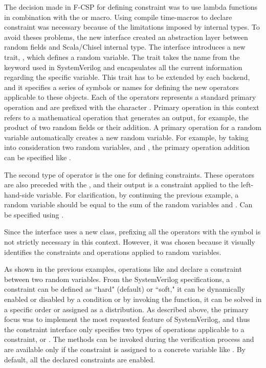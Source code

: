 \par The decision made in F-CSP for defining constraint was to use lambda
functions in combination with the  or  macro. Using
compile time-macros to declare constraint was necessary because of the
limitations imposed by internal types. To avoid theses problems, the new
interface created an abstraction layer between random fields and Scala/Chisel
internal type. The interface introduces a new trait, , which defines
a random variable. The trait  takes the name from the keyword used
in SystemVerilog and encapsulates all the current information regarding the
specific variable. This trait has to be extended by each backend, and it
specifies a series of symbols or names for defining the new operators applicable
to these objects. Each of the operators represents a standard primary operation
and are prefixed with the character \mints{#}. Primary operation in this context
refers to a mathematical operation that generates an output, for example, the
product of two random fields or their addition. A primary operation for a random
variable automatically creates a new random variable. For example, by taking
into consideration two random variables,  and , the primary
operation addition can be specified like .

\par The second type of operator is the one for defining constraints. These
operators are also preceded with the \mints{#}, and their output is a constraint
applied to the left-hand-side variable. For clarification, by continuing the
previous example, a random variable  should be equal to the sum of the
random variables  and . Can be specified using .

Since the interface uses a new class, prefixing all the operators with the
\mints{#} symbol is not strictly necessary in this context. However, it was
chosen because it visually identifies the constraints and operations applied to
random variables.


\par As shown in the previous examples, operations like \mints{#=} and
\mints{#\=} declare a constraint between two random variables. From the
SystemVerilog specifications, a constraint can be defined as ``hard" (default)
or ``soft," it can be dynamically enabled or disabled by a condition or by
invoking the  function, it can be solved in a specific
order or assigned as a distribution. As described above, the primary focus was
to implement the most requested feature of SystemVerilog, and thus the
constraint interface only specifies two types of operations applicable to a
constraint,  or . The methods can be invoked during
the verification process and are available only if the constraint is assigned to
a concrete variable like . By default, all
the declared constraints are enabled.


